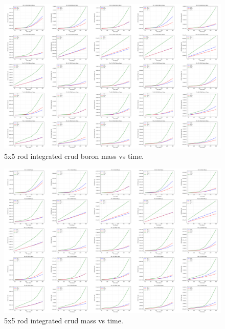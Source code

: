 \begin{landscape}
\begin{figure}[H]
    \centering
    \includegraphics[width=0.96\linewidth]{figs/5x5/imp/montage_time_bmass_sm}
    \caption{5x5 rod integrated crud boron mass vs time.}
    \label{fig:montagetimebmasssm}
\end{figure}


\begin{figure}[H]
    \centering
    \includegraphics[width=0.96\linewidth]{figs/5x5/imp/montage_time_cmass_sm}
    \caption{5x5 rod integrated crud mass vs time.}
    \label{fig:montagetimecmasssm}
\end{figure}

\end{landscape}
\restoregeometry